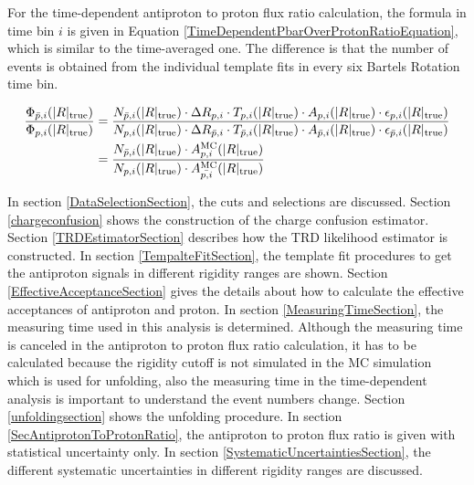 For the time-dependent antiproton to proton flux ratio calculation, the formula in time bin $i$ is given in Equation \ref{TimeDependentPbarOverProtonRatioEquation}, which is similar to the time-averaged one. The difference is that the number of events is obtained from the individual template fits in every six Bartels Rotation time bin. \par

\begin{equation} 
\begin{aligned}  
\frac{\Phi_{\bar{p},i}(|R|_{\rm{true}})}{\Phi_{p,i}(|R|_{\rm{true}})} &= \frac{N_{\bar{p},i}(|R|_{\rm{true}}) \cdot \Delta R_{p,i} \cdot T_{p,i}(|R|_{\rm{true}}) \cdot A_{p,i}(|R|_{\rm{true}}) \cdot \epsilon_{p,i}(|R|_{\rm{true}}) }{ N_{p,i}(|R|_{\rm{true}}) \cdot \Delta R_{\bar{p},i} \cdot T_{\bar{p},i}(|R|_{\rm{true}}) \cdot A_{\bar{p},i}(|R|_{\rm{true}}) \cdot \epsilon_{\bar{p},i}(|R|_{\rm{true}}) } \\ 
& = \frac{N_{\bar{p},i}(|R|_{\rm{true}}) \cdot A^\mathrm{MC}_{p,i}(|R|_{\rm{true}})}{N_{p,i}(|R|_{\rm{true}}) \cdot A^\mathrm{MC}_{\bar{p,i}}(|R|_{\rm{true}})}
\end{aligned}
\label{TimeDependentPbarOverProtonRatioEquation}
\end{equation}


In section \ref{DataSelectionSection}, the cuts and selections are discussed. Section \ref{chargeconfusion} shows the construction of the charge confusion estimator. Section \ref{TRDEstimatorSection} describes how the TRD likelihood estimator is constructed. In section \ref{TempalteFitSection}, the template fit procedures to get the antiproton signals in different rigidity ranges are shown. Section \ref{EffectiveAcceptanceSection} gives the details about how to calculate the effective acceptances of antiproton and proton. In section \ref{MeasuringTimeSection}, the measuring time used in this analysis is determined. Although the measuring time is canceled in the antiproton to proton flux ratio calculation, it has to be calculated because the rigidity cutoff is not simulated in the MC simulation which is used for unfolding, also the measuring time in the time-dependent analysis is important to understand the event numbers change. Section \ref{unfoldingsection} shows the unfolding procedure. In section \ref{SecAntiprotonToProtonRatio}, the antiproton to proton flux ratio is given with statistical uncertainty only. In section \ref{SystematicUncertaintiesSection}, the different systematic uncertainties in different rigidity ranges are discussed.  \par

